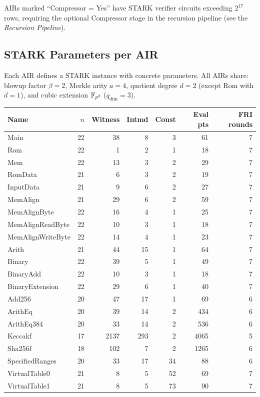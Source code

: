 AIRs marked ``Compressor = Yes'' have STARK verifier circuits exceeding
$2^{17}$ rows, requiring the optional Compressor stage in the recursion
pipeline (see the \emph{Recursion Pipeline}).

\subsection{STARK Parameters per AIR}
\label{sec:air-params}

Each AIR defines a STARK instance with concrete parameters.
All AIRs share: blowup factor $\beta = 2$, Merkle arity $a = 4$,
quotient degree $d = 2$ (except Rom with $d = 1$), and cubic extension
$\mathbb{F}_{p^3}$ ($q_{\mathrm{dim}} = 3$).

\begin{center}
\renewcommand{\arraystretch}{1.2}
\begin{tabular}{@{}lrrrrrr@{}}
  \toprule
  Name & $n$ & Witness & Intmd & Const & Eval pts & FRI rounds \\
  \midrule
  Main              & 22 &  38 &  8 &   3 &   61 & 7 \\
  Rom               & 22 &   1 &  2 &   1 &   18 & 7 \\
  Mem               & 22 &  13 &  3 &   2 &   29 & 7 \\
  RomData           & 21 &   6 &  3 &   2 &   19 & 7 \\
  InputData         & 21 &   9 &  6 &   2 &   27 & 7 \\
  MemAlign          & 21 &  29 &  6 &   2 &   59 & 7 \\
  MemAlignByte      & 22 &  16 &  4 &   1 &   25 & 7 \\
  MemAlignReadByte  & 22 &  10 &  3 &   1 &   18 & 7 \\
  MemAlignWriteByte & 22 &  14 &  4 &   1 &   23 & 7 \\
  Arith             & 21 &  44 & 15 &   1 &   64 & 7 \\
  Binary            & 22 &  39 &  5 &   1 &   49 & 7 \\
  BinaryAdd         & 22 &  10 &  3 &   1 &   18 & 7 \\
  BinaryExtension   & 22 &  29 &  6 &   1 &   40 & 7 \\
  Add256            & 20 &  47 & 17 &   1 &   69 & 6 \\
  ArithEq           & 20 &  39 & 14 &   2 &  434 & 6 \\
  ArithEq384        & 20 &  33 & 14 &   2 &  536 & 6 \\
  Keccakf           & 17 & 2137 & 293 & 2 & 4065 & 5 \\
  Sha256f           & 18 & 102 &  7 &   2 & 1265 & 6 \\
  SpecifiedRanges   & 20 &  33 & 17 &  34 &   88 & 6 \\
  VirtualTable0     & 21 &   8 &  5 &  52 &   69 & 7 \\
  VirtualTable1     & 21 &   8 &  5 &  73 &   90 & 7 \\
  \bottomrule
\end{tabular}
\end{center}

